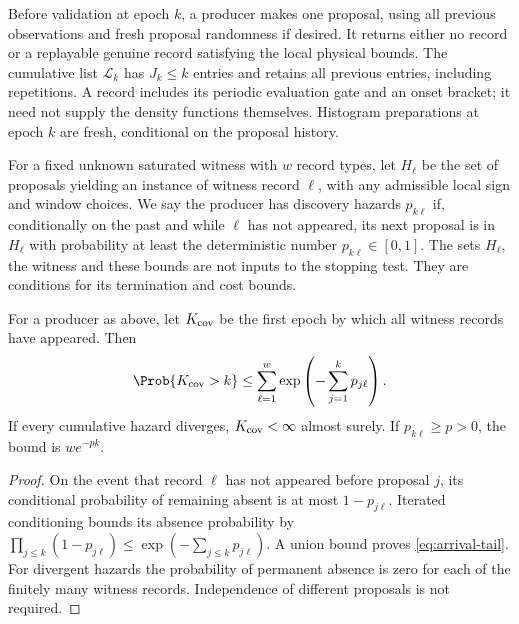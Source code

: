 \begin{definition}\label{def:producer}
Before validation at epoch $k$, a producer makes one proposal, using all
previous observations and fresh proposal randomness if desired. It returns
either no record or a replayable genuine record satisfying the local
physical bounds. The cumulative list $\mathcal L_k$ has $J_k\le k$
entries and retains all previous entries, including repetitions. A record
includes its periodic evaluation gate and an onset bracket; it need not
supply the density functions themselves. Histogram preparations at epoch
$k$ are fresh, conditional on the proposal history.

For a fixed unknown saturated witness with $w$ record types, let $H_\ell$
be the set of proposals yielding an instance of witness record $\ell$,
with any admissible local sign and window choices. We say the producer
has discovery hazards $p_{k\ell}$ if, conditionally on the past and while
$\ell$ has not appeared, its next proposal is in $H_\ell$ with probability
at least the deterministic number $p_{k\ell}\in[0,1]$.
The sets $H_\ell$, the witness and these bounds are not inputs to the
stopping test. They are conditions for its termination and cost bounds.
\end{definition}

\begin{lemma}\label{lem:arrival}
For a producer as above, let $K_{\rm cov}$ be the first epoch by which
all witness records have appeared. Then
\begin{equation}\label{eq:arrival-tail}
 \Prob\{K_{\rm cov}>k\}\le
       \sum_{\ell=1}^w\exp\left(-\sum_{j=1}^kp_{j\ell}\right).
\end{equation}
If every cumulative hazard diverges, $K_{\rm cov}<\infty$ almost surely.
If $p_{k\ell}\ge p>0$, the bound is $w e^{-pk}$.
\end{lemma}
\begin{proof}
On the event that record $\ell$ has not appeared before proposal $j$,
its conditional probability of remaining absent is at most $1-p_{j\ell}$.
Iterated conditioning bounds its absence probability by
$\prod_{j\le k}(1-p_{j\ell})\le\exp(-\sum_{j\le k}p_{j\ell})$.
A union bound proves \eqref{eq:arrival-tail}. For divergent hazards the
probability of permanent absence is zero for each of the finitely many
witness records. Independence of different proposals is not required.
\end{proof}

